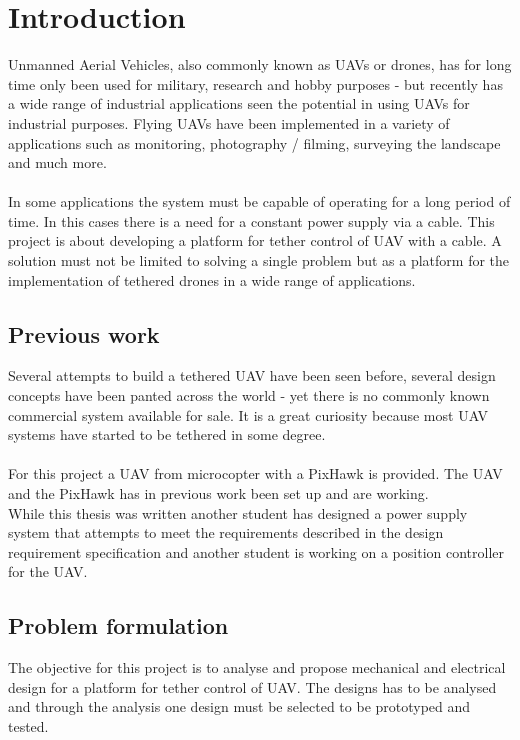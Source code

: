 \chapter{Introduction}

Unmanned Aerial Vehicles, also commonly known as UAVs or drones, has for long time only been used for military, research and hobby purposes - but recently has a wide range of industrial applications seen the potential in using UAVs for industrial purposes.
Flying UAVs have been implemented in a variety of applications such as monitoring, photography / filming, surveying the landscape and much more.\\
\\
In some applications the system must be capable of operating for a long period of time. In this cases there is a need for a constant power supply via a cable. This project is about developing a platform for tether control of UAV with a cable.
A solution must not be limited to solving a single problem but as a platform for the implementation of tethered drones in a wide range of applications.


\section{Previous work}
Several attempts to build a tethered UAV have been seen before, several design concepts have been panted across the world - yet there is no commonly known commercial system available for sale. It is a great curiosity because most UAV systems have started to be tethered in some degree.\\
\\
For this project a UAV from microcopter with a PixHawk is provided. The UAV and the PixHawk has in previous work been set up and are working.\\
\noindent
While this thesis was written another student has designed a power supply system that attempts to meet the requirements described in the design requirement specification and another student is working on a position controller for the UAV.\\
 


\section{Problem formulation} 

The objective for this project is to analyse and propose mechanical and electrical design for a platform for tether control of UAV. The designs has to be analysed and through the analysis one design must be selected to be prototyped and tested.

